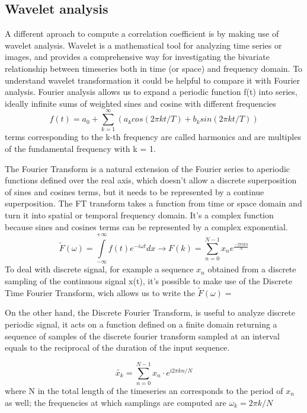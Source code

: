 \documentclass[a4paper,11pt]{article}
\begin{document}
\subsection{Wavelet analysis}
A different aproach to compute a correlation coefficient is by making use of wavelet analysis.
Wavelet is a mathematical tool for analyzing time series or images, and provides a comprehensive way for investigating the bivariate relationship between timeseries both in time (or space) and frequency domain.
To understand wavelet transformation it could be helpful to compare it with Fourier analysis.
Fourier analysis allows us to expand a periodic function f(t) into series, ideally infinite sums of weighted sines and cosine with different frequencies
\begin{equation}
f(t) = a_0 + \sum_{k = 1}^\infty (a_k cos(2\pi k t/T) + b_k sin (2\pi k t /T))
\end{equation}
terms corresponding to the k-th frequency are called harmonics and are multiples of the fundamental frequency with k = 1.

The Fourier Transform is a natural extension of the Fourier series to aperiodic functions defined over the real axis, which doesn't allow a discrete superposition of sines and cosines terms, but it needs to be represented by a continue superposition.
The FT transform takes a function from time or space domain and turn it into spatial or temporal frequency domain.
It's a complex function because sines and cosines terms can be represented by a complex exponential.
\begin{equation}
\tilde{F}(\omega) = \int\limits_{-\infty}^{+\infty} f(t)e^{-i \omega t} dx \longrightarrow F(k) = \sum_{n = 0}^{N-1}x_n e^{\frac{-2\pi i k n}{N}}
\end{equation}
To deal with discrete signal, for example a sequence $x_n$ obtained from a discrete sampling of the continuous signal x(t), it's possible to make use of the Discrete Time Fourier Transform, wich allows us to write the $\tilde F(\omega) = $

On the other hand, the Discrete Fourier Transform, is useful to analyze discrete periodic signal, it acts on a function defined on a finite domain returning a sequence of samples of the discrete fourier transform sampled at an interval equals to the reciprocal of the duration of the input sequence.

\begin{equation}
\tilde{x_k} = \sum_{n=0}^{N-1} x_n \cdot e^{i 2\pi kn/N}
\end{equation}
where N in the total length of the timeseries an corresponds to the period of $x_n$ as well; the frequencies at which samplings are computed are $\omega_k = 2\pi k/N$
\end{document}
